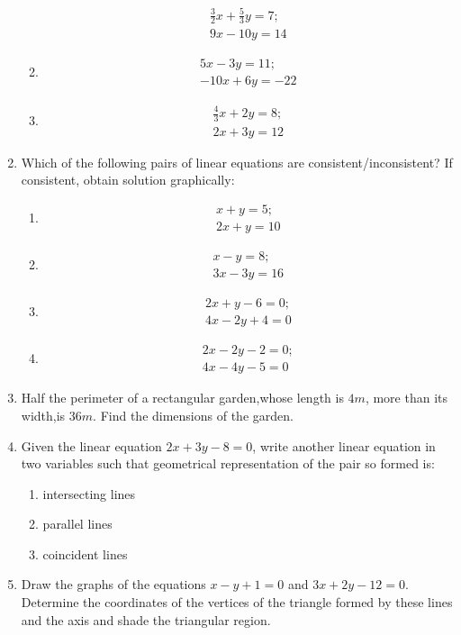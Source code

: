 \begin{enumerate}
\begin{enumerate}[label=(\roman*)]
\begin{align}
		\frac{3}{2}x+\frac{5}{3}y=7;\\
		9x-10y=14
		\end{align}
\item \begin{align}
		5x-3y=11;\\
		-10x+6y=-22
	\end{align}
\item \begin{align}
         \frac{4}{3}x+2y=8;\\
	  2x+3y=12
	\end{align}
\end{enumerate}
\item Which of the following pairs of linear equations are consistent/inconsistent? If consistent, obtain solution graphically:
\begin{enumerate}[label=(\roman*)]
\item \begin{align}
	x+y=5;\\
	2x+y=10
	\end{align}
\item \begin{align}
	x-y=8;\\
	3x-3y=16
	\end{align}
\item \begin{align}
 	2x+y-6=0;\\
 	4x-2y+4=0
	\end{align}
\item \begin{align}
	2x-2y-2=0;\\
	4x-4y-5=0
	\end{align}
\end{enumerate}
\item Half the perimeter of a rectangular garden,whose length is $4m$, more than its width,is $36m$. Find the dimensions of the garden.
\item Given the linear equation $2x+3y-8=0$, write another linear equation in two variables such that geometrical representation of the pair so formed is:
\begin{enumerate}[label=(\roman*)]
\item intersecting lines
\item parallel lines
\item coincident lines
\end{enumerate}
\item Draw the graphs of the equations $x-y+1=0$ and $3x+2y-12=0$. Determine the coordinates of the vertices of the triangle formed by these lines and the axis and shade the triangular region.
\end{enumerate}
